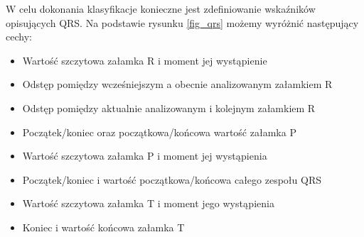 W celu dokonania klasyfikacje konieczne jest zdefiniowanie wskaźników opisujących QRS. Na podstawie rysunku \ref{fig_qrs} możemy wyróżnić następujący cechy:

	\begin{itemize}
	\item{Wartość szczytowa załamka R i moment jej wystąpienie} 
	\item{Odstęp pomiędzy wcześniejszym a obecnie analizowanym załamkiem R}
	\item{Odstęp pomiędzy aktualnie analizowanym i kolejnym załamkiem R}
	\item{Początek/koniec oraz początkowa/końcowa wartość załamka P}
	\item{Wartość szczytowa załamka P i moment jej wystąpienia}
	\item{Początek/koniec i wartość początkowa/końcowa całego zespołu QRS}
	\item{Wartość szczytowa załamka T i moment jego wystąpienia}
	\item{Koniec i wartość końcowa załamka T}
	\end{itemize}